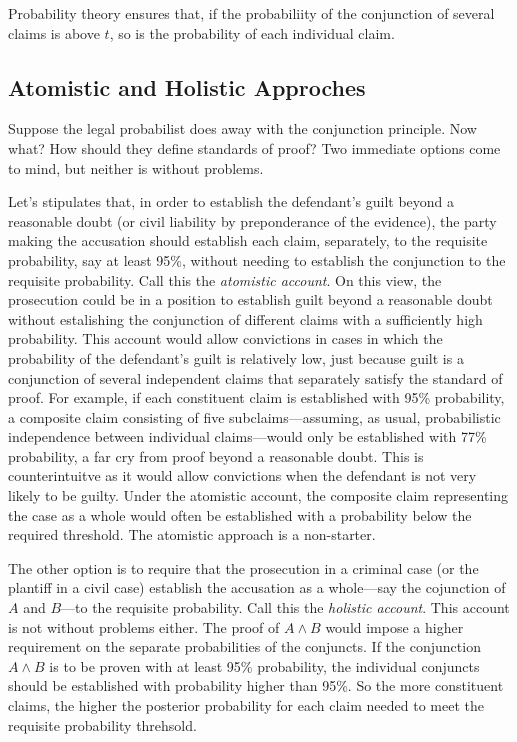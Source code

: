 \documentclass[10pt,dvipsnames,enabledeprecatedfontcommands]{scrartcl}
\newcommand{\et}{\wedge}
\begin{document}
\noindent Probability theory ensures that, if the probabiliity of the
conjunction of several claims is above \(t\), so is the probability of
each individual claim.

\hypertarget{atomistic-and-holistic-approches}{%
\subsection{Atomistic and Holistic
Approches}\label{atomistic-and-holistic-approches}}

Suppose the legal probabilist does away with the conjunction principle.
Now what? How should they define standards of proof? Two immediate
options come to mind, but neither is without problems.

Let's stipulates that, in order to establish the defendant's guilt
beyond a reasonable doubt (or civil liability by preponderance of the
evidence), the party making the accusation should establish each claim,
separately, to the requisite probability, say at least 95\%, without
needing to establish the conjunction to the requisite probability. Call
this the \textit{atomistic account}. On this view, the prosecution could
be in a position to establish guilt beyond a reasonable doubt without
estalishing the conjunction of different claims with a sufficiently high
probability. This account would allow convictions in cases in which the
probability of the defendant's guilt is relatively low, just because
guilt is a conjunction of several independent claims that separately
satisfy the standard of proof. For example, if each constituent claim is
established with 95\% probability, a composite claim consisting of five
subclaims---assuming, as usual, probabilistic independence between
individual claims---would only be established with 77\% probability, a
far cry from proof beyond a reasonable doubt. This is counterintuitve as
it would allow convictions when the defendant is not very likely to be
guilty. Under the atomistic account, the composite claim representing
the case as a whole would often be established with a probability below
the required threshold. The atomistic approach is a non-starter.

The other option is to require that the prosecution in a criminal case
(or the plantiff in a civil case) establish the accusation as a
whole---say the cojunction of \(A\) and \(B\)---to the requisite
probability. Call this the \textit{holistic account}. This account is
not without problems either. The proof of \(A\et B\) would impose a
higher requirement on the separate probabilities of the conjuncts. If
the conjunction \(A\et B\) is to be proven with at least 95\%
probability, the individual conjuncts should be established with
probability higher than 95\%. So the more constituent claims, the higher
the posterior probability for each claim needed to meet the requisite
probability threhsold.
\end{document}

